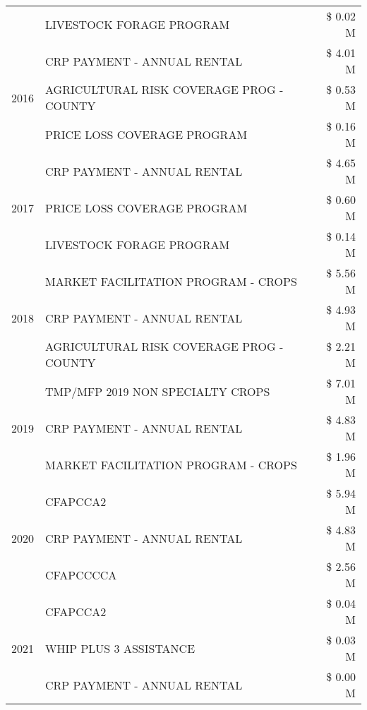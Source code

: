 \begin{tabular}{llr}
 & LIVESTOCK FORAGE PROGRAM & \$ 0.02 M \\
\cline{1-3}
\multirow[t]{3}{*}{2016} & CRP PAYMENT - ANNUAL RENTAL & \$ 4.01 M \\
 & AGRICULTURAL RISK COVERAGE PROG - COUNTY & \$ 0.53 M \\
 & PRICE LOSS COVERAGE PROGRAM & \$ 0.16 M \\
\cline{1-3}
\multirow[t]{3}{*}{2017} & CRP PAYMENT - ANNUAL RENTAL & \$ 4.65 M \\
 & PRICE LOSS COVERAGE PROGRAM & \$ 0.60 M \\
 & LIVESTOCK FORAGE PROGRAM & \$ 0.14 M \\
\cline{1-3}
\multirow[t]{3}{*}{2018} & MARKET FACILITATION PROGRAM - CROPS & \$ 5.56 M \\
 & CRP PAYMENT - ANNUAL RENTAL & \$ 4.93 M \\
 & AGRICULTURAL RISK COVERAGE PROG - COUNTY & \$ 2.21 M \\
\cline{1-3}
\multirow[t]{3}{*}{2019} & TMP/MFP 2019 NON SPECIALTY CROPS & \$ 7.01 M \\
 & CRP PAYMENT - ANNUAL RENTAL & \$ 4.83 M \\
 & MARKET FACILITATION PROGRAM - CROPS & \$ 1.96 M \\
\cline{1-3}
\multirow[t]{3}{*}{2020} & CFAPCCA2 & \$ 5.94 M \\
 & CRP PAYMENT - ANNUAL RENTAL & \$ 4.83 M \\
 & CFAPCCCCA & \$ 2.56 M \\
\cline{1-3}
\multirow[t]{3}{*}{2021} & CFAPCCA2 & \$ 0.04 M \\
 & WHIP PLUS 3 ASSISTANCE & \$ 0.03 M \\
 & CRP PAYMENT - ANNUAL RENTAL & \$ 0.00 M \\
\cline{1-3}
\bottomrule
\end{tabular}
